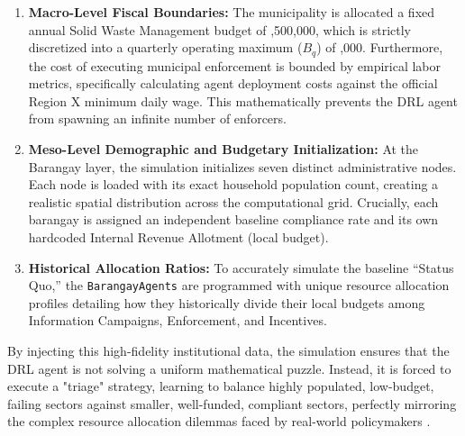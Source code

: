 \begin{enumerate}
    \item \textbf{Macro-Level Fiscal Boundaries:} The municipality is allocated a fixed annual Solid Waste Management budget of ,500,000, which is strictly discretized into a quarterly operating maximum ($B_q$) of ,000. Furthermore, the cost of executing municipal enforcement is bounded by empirical labor metrics, specifically calculating agent deployment costs against the official Region X minimum daily wage. This mathematically prevents the DRL agent from spawning an infinite number of enforcers.
    
    \item \textbf{Meso-Level Demographic and Budgetary Initialization:} At the Barangay layer, the simulation initializes seven distinct administrative nodes. Each node is loaded with its exact household population count, creating a realistic spatial distribution across the computational grid. Crucially, each barangay is assigned an independent baseline compliance rate and its own hardcoded Internal Revenue Allotment (local budget). 
    
    \item \textbf{Historical Allocation Ratios:} To accurately simulate the baseline ``Status Quo,'' the \texttt{BarangayAgents} are programmed with unique resource allocation profiles detailing how they historically divide their local budgets among Information Campaigns, Enforcement, and Incentives. 
\end{enumerate}

By injecting this high-fidelity institutional data, the simulation ensures that the DRL agent is not solving a uniform mathematical puzzle. Instead, it is forced to execute a "triage" strategy, learning to balance highly populated, low-budget, failing sectors against smaller, well-funded, compliant sectors, perfectly mirroring the complex resource allocation dilemmas faced by real-world policymakers \citep{TianReview2024}.